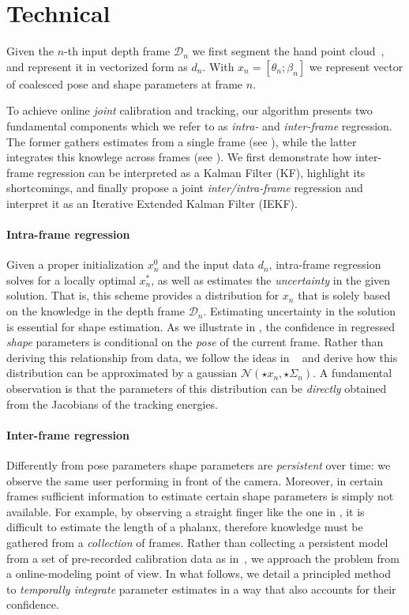 \section{Technical}
Given the $n$-th input depth frame $\mathcal{D}_n$ we first segment the hand point cloud~\cite{htrack}, and represent it in vectorized form as $d_n$. With $x_n = [\theta_n; \beta_n]$ we represent vector of coalesced pose and shape parameters at frame $n$. 

To achieve online \emph{joint} calibration and tracking, our algorithm presents two fundamental components which we refer to as \emph{intra-} and \emph{inter-frame} regression. The former gathers estimates from a single frame (see ), while the latter integrates this knowlege across frames (see ). We first demonstrate how inter-frame regression can be interpreted as a Kalman Filter (KF), highlight its shortcomings, and finally propose a joint \emph{inter/intra-frame} regression and interpret it as an Iterative Extended Kalman Filter (IEKF).


\paragraph{Intra-frame regression}
Given a proper initialization $x_n^0$ and the input data $d_n$, intra-frame regression solves for a locally optimal $x_n^*$, as well as estimates the \emph{uncertainty} in the given solution. That is, this scheme provides a distribution for $x_n$ that is solely based on the knowledge in the depth frame $\mathcal{D}_n$. Estimating uncertainty in the solution is essential for shape estimation. As we illustrate in , the confidence in regressed \emph{shape} parameters is conditional on the \emph{pose} of the current frame.
Rather than deriving this relationship from data, we follow the ideas in ~ and derive how this distribution can be approximated by a gaussian $\mathcal{N}(\star{x}_n, \star{\Sigma}_n)$. A fundamental observation is that the parameters of this distribution can be \emph{directly} obtained from the Jacobians of the tracking energies.


\paragraph{Inter-frame regression}
Differently from pose parameters shape parameters are \emph{persistent} over time: we observe the same user performing in front of the camera. Moreover, in certain frames sufficient information to estimate certain shape parameters is simply not available. For example, by observing a straight finger like the one in , it is difficult to estimate the length of a phalanx, therefore knowledge must be gathered from a \emph{collection} of frames. Rather than collecting a persistent model from a set of pre-recorded calibration data as in~\cite{taylor_sig16}, we approach the problem from a online-modeling point of view. In what follows, we detail a principled method to \emph{temporally integrate} parameter estimates in a way that also accounts for their confidence.

